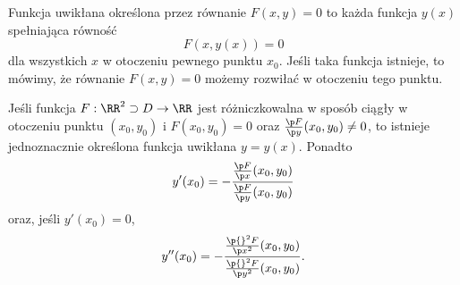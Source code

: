 \begin{definition}
    Funkcja uwikłana określona przez równanie $F(x, y) = 0$ to każda funkcja $y(x)$ spełniająca równość
    \[ F(x, y(x)) = 0 \]
    dla wszystkich $x$ w otoczeniu pewnego punktu $x_0$. Jeśli taka funkcja istnieje, to mówimy, że równanie $F(x, y) = 0$ możemy rozwiłać w otoczeniu tego punktu.
\end{definition}

\begin{theorem}
    Jeśli funkcja $F : \RR^2 \supset D \to \RR$ jest różniczkowalna w sposób ciągły w otoczeniu punktu $(x_0, y_0)$ i $F(x_0, y_0) = 0$ oraz $\frac{\p F}{\p y}(x_0, y_0) \neq 0$, to istnieje jednoznacznie określona funkcja uwikłana $y = y(x)$. Ponadto
    \[ y'(x_0) = -\frac{\frac{\p F}{\p x}(x_0, y_0)}{\frac{\p F}{\p y}(x_0, y_0)} \]
    oraz, jeśli $y'(x_0) = 0$,
    \[ y''(x_0) = -\frac{\frac{\p{}^2 F}{\p x^2}(x_0, y_0)}{\frac{\p{}^2 F}{\p y^2}(x_0, y_0)}. \]
\end{theorem}